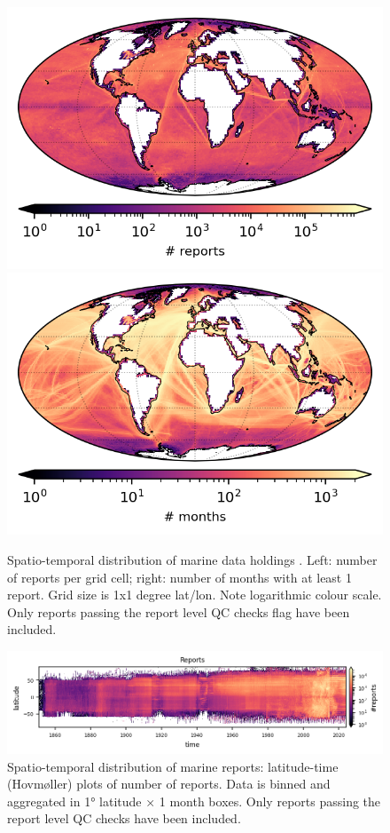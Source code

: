 \begin{figure} [h]
    \centering
    \includegraphics{resources/header-reports-map-optimal.png}
    \includegraphics{resources/header-months-map-optimal.png}
    \caption{Spatio-temporal distribution of marine data holdings \datatimerange{}. Left: number of reports per grid cell; right: number of months with at least 1 report. Grid size is 1x1 degree lat/lon. Note logarithmic colour scale. Only reports passing the report level QC checks flag have been included.\\}
    \label{fig:nreports-map}
\end{figure}

\begin{figure}
    \centering
    \includegraphics{resources/header-nreports_hovmoller_monthly}
    \caption{Spatio-temporal distribution of marine reports: latitude-time (Hovmøller) plots of number of reports. Data is binned and aggregated in 1° latitude × 1 month boxes. Only reports passing the report level QC checks have been included.\\}
    \label{fig:nreports-hovmoller}
\end{figure}

